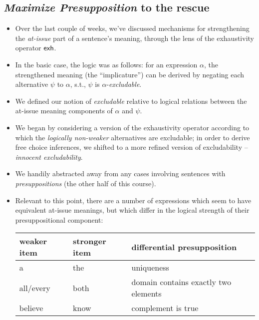 \documentclass[landscape,twocolumn,cronos,paper=letter]{ling-handout}
\begin{document}
    \subsection{\textit{Maximize Presupposition} to the rescue}

    \begin{itemize}

        \item Over the last couple of weeks, we've discussed mechanisms for
        strengthening the \textit{at-issue} part of a sentence's meaning,
        through the lens of the exhaustivity operator $\textsf{exh}$.

        \item In the basic case, the logic was as follows: for an expression
        $\alpha$, the strengthened meaning (the \enquote{implicature}) can be derived by negating each
        alternative $\psi$ to $\alpha$, s.t., $\psi$ is $\alpha$-\textit{excludable}.

        \item We defined our notion of \textit{excludable} relative to logical
        relations between the at-issue meaning components of $\alpha$ and
        $\psi$.

        \item We began by considering a version of the exhaustivity operator
        according to which the \textit{logically non-weaker} alternatives are
        excludable; in order to derive free choice inferences, we shifted to a
        more refined version of excludability -- \textit{innocent
        excludability}.

        \item We handily abstracted away from any cases involving sentences with
        \textit{presuppositions} (the other half of this course).

        \item Relevant to this point, there are a number of expressions which seem to have equivalent
        at-issue meanings, but which differ in the logical strength of their
        presuppositional component:

        \begin{table}[h!]
        \begin{center}
\begin{tabular}{lll}
 weaker item & stronger item  & differential presupposition  \\
  \hline
 a & the  & uniqueness  \\
  all/every & both  & domain contains exactly two elements\\
  believe & know & complement is true
\end{tabular}
\end{center}
\end{table}


\end{itemize}
\end{document}
